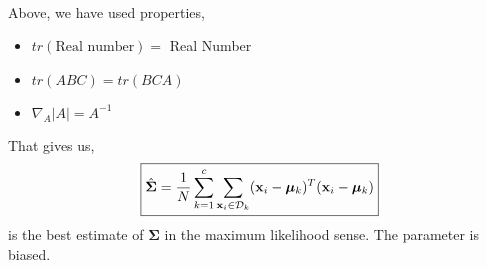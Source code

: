 \documentclass[11pt,paper=a4,answers]{exam}
\renewcommand{\vec}[1]{\mathbf{#1}}
\begin{document}
\begin{questions}
\begin{enumerate}[i.]
\begin{align*}
        \end{align*}
        Above, we have used properties,
        \begin{itemize}
             \item $tr(\text{Real number}) =$ Real Number
             \item $tr(ABC) = tr(BCA)$
             \item $\nabla _A |A| = A^{-1}$
         \end{itemize}
        That gives us,
        \begin{align}
        \boxed{\hat{\bm{\Sigma}} = {1 \over N}\sum_{k=1}^c \sum_{\vec{x}_i \in \mathcal{D}_k} (\vec{x}_i - \bm{\mu}_k)^T (\vec{x}_i - \bm{\mu}_k)}
        \end{align}
        is the best estimate of $\bm{\Sigma}$ in the maximum likelihood sense. The parameter is biased.


\end{enumerate}
\end{questions}
\end{document}
